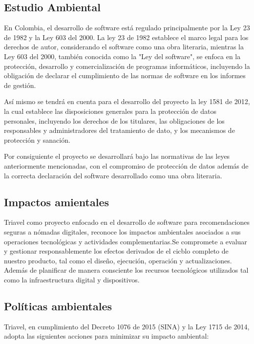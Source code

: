 \subsection{Estudio Ambiental}

En Colombia, el desarrollo de software está regulado principalmente por la Ley 23 de 1982 y la Ley 603 del 2000. La ley 23 de 1982 establece el marco legal para los derechos de autor, considerando el software como una obra literaria, mientras la Ley 603 del 2000, también conocida como la "Ley del software", se enfoca en la protección, desarrollo y comercialización de programas informáticos, incluyendo la obligación de declarar el cumplimiento de las normas de software en los informes de gestión.

Así mismo se tendrá en cuenta para el desarrollo del proyecto la ley 1581 de 2012, la cual establece las disposiciones generales para la protección de datos personales, incluyendo los derechos de los titulares, las obligaciones de los responsables y administradores del tratamiento de dato, y los mecanismos de protección y sanación.

Por consiguiente el proyecto se desarrollará bajo las normativas de las leyes anteriormente mencionadas, con el compromiso de protección de datos además de la correcta declaración del software desarrollado como una obra literaria.

\subsection*{Impactos amientales}

Triavel como proyecto enfocado en el desarrollo de software para recomendaciones seguras a nómadas digitales, reconoce los impactos ambientales asociados a sus operaciones tecnológicas y actividades complementarias.Se compromete a evaluar y gestionar responsablemente los efectos derivados de el cicblo completo de nuestro producto, tal como el diseño, ejecución, operación y actualizaciones. Además de planificar de manera consciente los recursos tecnológicos utilizados tal como la infraestructura digital y dispositivos.

\subsection*{Políticas ambientales}
Triavel, en cumplimiento del Decreto 1076 de 2015 (SINA) y la Ley 1715 de 2014, adopta las siguientes acciones para minimizar su impacto ambiental:

